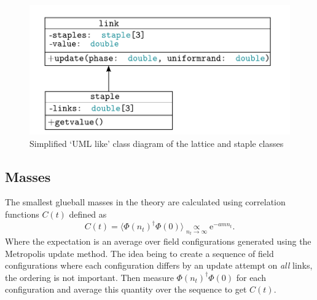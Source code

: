 \documentclass[12pt]{article}
\begin{document}
\begin{figure}
\centering
\includegraphics[width=0.7\linewidth]{latticeclass.pdf}
\caption{\label{fig:latticeclass} Simplified `UML like' class diagram of the lattice and staple classes}
\end{figure}

\subsection{Masses}
The smallest glueball masses in the theory are calculated using correlation functions $C(t)$ defined as
\begin{equation}
    C(t) = \langle \Phi(n_t)^{\dagger}\Phi(0) \rangle \underset{n_t\rightarrow \infty}{\propto} \mathrm{e}^{-amn_t}.
\end{equation}
Where the expectation is an average over field configurations generated using the Metropolis update method. The idea being to create a sequence of field configurations where each configuration differs by an update attempt on \emph{all} links, the ordering is not important. Then measure $\Phi(n_t)^{\dagger}\Phi(0)$ for each configuration and average this quantity over the sequence to get $C(t)$.
\end{document}
